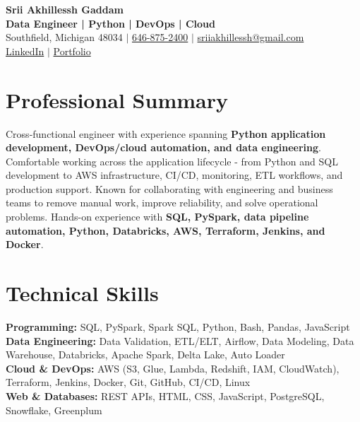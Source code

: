 \documentclass[letterpaper,10pt]{article}
\begin{document}
\fontsize{9.35pt}{10.45pt}\selectfont

\begin{center}
    {\LARGE \textbf{Srii Akhillessh Gaddam}} \\[-1pt]
    \textbf{Data Engineer | Python | DevOps | Cloud} \\[2pt]
    Southfield, Michigan 48034 $|$
    \href{tel:6468752400}{646-875-2400} $|$
    \href{mailto:sriiakhillessh@gmail.com}{sriiakhillessh@gmail.com} \\[1pt]
    \href{https://www.linkedin.com/in/srii-akhiilessh-gaddam-b48668191/}{LinkedIn} $|$
    \href{https://sriiakhillesshg.github.io/portfolio/}{Portfolio}
\end{center}
\vspace{-8pt}

\section{Professional Summary}
\small{Cross-functional engineer with experience spanning \textbf{Python application development, DevOps/cloud automation, and data engineering}. Comfortable working across the application lifecycle - from Python and SQL development to AWS infrastructure, CI/CD, monitoring, ETL workflows, and production support. Known for collaborating with engineering and business teams to remove manual work, improve reliability, and solve operational problems. Hands-on experience with \textbf{SQL, PySpark, data pipeline automation, Python, Databricks, AWS, Terraform, Jenkins, and Docker}.}

\section{Technical Skills}
\small{
\textbf{Programming:} SQL, PySpark, Spark SQL, Python, Bash, Pandas, JavaScript \\
\textbf{Data Engineering:} Data Validation, ETL/ELT, Airflow, Data Modeling, Data Warehouse, Databricks, Apache Spark, Delta Lake, Auto Loader \\
\textbf{Cloud \& DevOps:} AWS (S3, Glue, Lambda, Redshift, IAM, CloudWatch), Terraform, Jenkins, Docker, Git, GitHub, CI/CD, Linux \\
\textbf{Web \& Databases:} REST APIs, HTML, CSS, JavaScript, PostgreSQL, Snowflake, Greenplum
}
\end{document}
